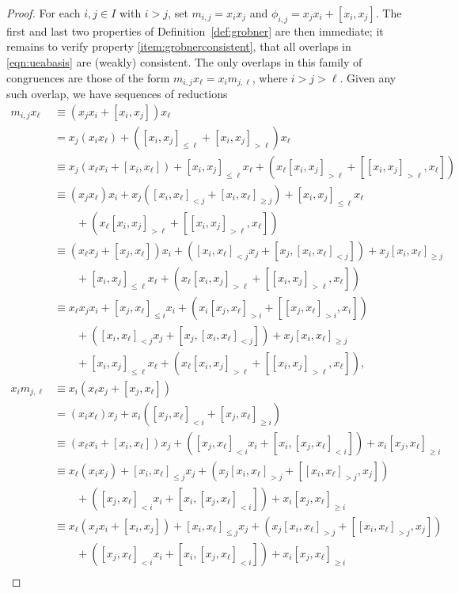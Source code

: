 \begin{proof}
For each $i,j\in I$ with $i>j$, set $m_{i,j}=x_ix_j$ and $\phi_{i,j}=x_jx_i+[x_i,x_j]$. The first and last two properties of Definition~\ref{def:grobner} are then immediate; it remains to verify property \eqref{item:grobnerconsistent}, that all overlaps in \eqref{eqn:ueabasis} are (weakly) consistent. The only overlaps in this family of congruences are those of the form $m_{i,j}x_\ell=x_im_{j,\ell}$, where $i>j>\ell$. Given any such overlap, we have sequences of reductions
\begin{align*}
m_{i,j}x_\ell&\equiv(x_jx_i+[x_i,x_j])x_\ell\\
&=x_j(x_ix_\ell)+([x_i,x_j]_{\le\ell}+[x_i,x_j]_{>\ell})x_\ell\\
&\equiv x_j(x_\ell x_i+[x_i,x_\ell])+[x_i,x_j]_{\le\ell}x_\ell+(x_\ell[x_i,x_j]_{>\ell}+[[x_i,x_j]_{>\ell},x_\ell])\\
&\equiv(x_jx_\ell)x_i+x_j([x_i,x_\ell]_{<j}+[x_i,x_\ell]_{\ge j})+[x_i,x_j]_{\le\ell}x_\ell\\
&\qquad+(x_\ell[x_i,x_j]_{>\ell}+[[x_i,x_j]_{>\ell},x_\ell])\\
&\equiv(x_\ell x_j+[x_j,x_\ell])x_i+([x_i,x_\ell]_{<j}x_j+[x_j,[x_i,x_\ell]_{<j}])+x_j[x_i,x_\ell]_{\ge j}\\
&\qquad+[x_i,x_j]_{\le\ell}x_\ell+(x_\ell[x_i,x_j]_{>\ell}+[[x_i,x_j]_{>\ell},x_\ell])\\
&\equiv x_\ell x_jx_i+[x_j,x_\ell]_{\le i}x_i+(x_i[x_j,x_\ell]_{>i}+[[x_j,x_\ell]_{>i},x_i])\\
&\qquad+([x_i,x_\ell]_{<j}x_j+[x_j,[x_i,x_\ell]_{<j}])+x_j[x_i,x_\ell]_{\ge j}\\
&\qquad+[x_i,x_j]_{\le\ell}x_\ell+(x_\ell[x_i,x_j]_{>\ell}+[[x_i,x_j]_{>\ell},x_\ell]),\\
x_im_{j,\ell}&\equiv x_i(x_\ell x_j+[x_j,x_\ell])\\
&=(x_ix_\ell)x_j+x_i([x_j,x_\ell]_{<i}+[x_j,x_\ell]_{\ge i})\\
&\equiv(x_\ell x_i+[x_i,x_\ell])x_j+([x_j,x_\ell]_{<i}x_i+[x_i,[x_j,x_\ell]_{<i}])+x_i[x_j,x_\ell]_{\ge i}\\
&\equiv x_\ell(x_ix_j)+[x_i,x_\ell]_{\le j}x_j+(x_j[x_i,x_\ell]_{>j}+[[x_i,x_\ell]_{>j},x_j])\\
&\qquad+([x_j,x_\ell]_{<i}x_i+[x_i,[x_j,x_\ell]_{<i}])+x_i[x_j,x_\ell]_{\ge i}\\
&\equiv x_\ell(x_jx_i+[x_i,x_j])+[x_i,x_\ell]_{\le j}x_j+(x_j[x_i,x_\ell]_{>j}+[[x_i,x_\ell]_{>j},x_j])\\
&\qquad+([x_j,x_\ell]_{<i}x_i+[x_i,[x_j,x_\ell]_{<i}])+x_i[x_j,x_\ell]_{\ge i}\\

\end{align*}
\end{proof}
